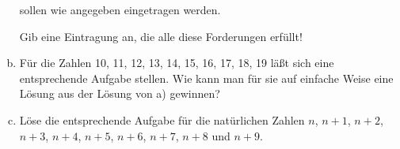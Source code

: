 \begin{exercise}
\begin{enumerate}[a)]
\begin{minipage}[t]{0.74\linewidth}
              sollen wie angegeben eingetragen werden.\medskip\par
              Gib eine Eintragung an, die alle diese Forderungen erfüllt!
            \end{minipage}
      \item Für die Zahlen 10, 11, 12, 13, 14, 15, 16, 17, 18, 19 läßt sich
            eine entsprechende Aufgabe stellen. Wie kann man für sie auf einfache
            Weise eine Lösung aus der Lösung von a) gewinnen?
      \item Löse die entsprechende Aufgabe für die natürlichen Zahlen
            $n$, $n+1$, $n+2$, $n+3$, $n+4$, $n+5$, $n+6$, $n+7$, $n+8$ und $n+9$.
    \end{enumerate}
  \fi
\end{exercise}
